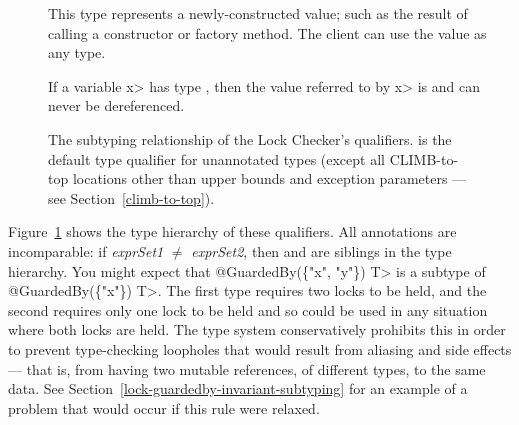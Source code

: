 \begin{description}
\item[]
  This type represents a newly-constructed value; such as the result of
  calling a constructor or factory method.  The client can use the value as
  any  type.

\item[]
  If a variable \<x> has type , then
  the value referred to by \<x> is  and can never
  be dereferenced.

\end{description}

\begin{figure}
\caption{The subtyping relationship of the Lock Checker's qualifiers.
 is the default type qualifier for unannotated
types (except all CLIMB-to-top locations other than upper bounds and exception
parameters --- see Section~\ref{climb-to-top}).
}
\label{fig-lock-guardedby-hierarchy}
\end{figure}

Figure~\ref{fig-lock-guardedby-hierarchy} shows the type hierarchy of these
qualifiers.
All  annotations are incomparable:
if \emph{exprSet1} $\neq$ \emph{exprSet2}, then  and
 are siblings in the type hierarchy.
You might expect that
\<@GuardedBy(\{"x", "y"\}) T> is a subtype of \<@GuardedBy(\{"x"\}) T>.  The
first type requires two locks to be held, and the second requires only one
lock to be held and so could be used in any situation where both locks are
held.  The type system conservatively prohibits this in order to prevent
type-checking loopholes that would result from aliasing and side effects
--- that is, from having two mutable references, of different types, to the
same data. See
Section~\ref{lock-guardedby-invariant-subtyping} for an example
of a problem that would occur if this rule were relaxed.




